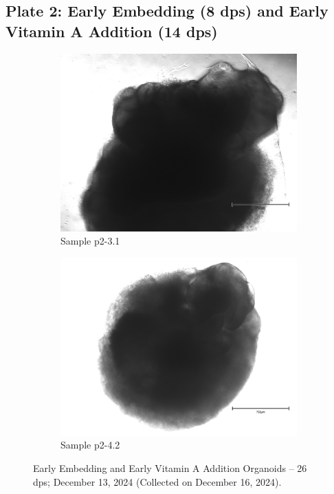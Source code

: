 \documentclass[11pt]{article}
\begin{document}
\subsection{Plate 2: Early Embedding (8 dps) and Early Vitamin A Addition (14 dps)}

\begin{figure}[H]
    \centering
    \begin{subfigure}[b]{0.40\textwidth}
        \centering
        \includegraphics[width=\textwidth]{p2-3.1.jpeg}
        \caption{Sample p2-3.1}
        \label{fig:p2-3.1}
    \end{subfigure}
    \hfill
    \begin{subfigure}[b]{0.40\textwidth}
        \centering
        \includegraphics[width=\textwidth]{p2-4.2.jpeg}
        \caption{Sample p2-4.2}
        \label{fig:p2-4.2}
    \end{subfigure}
    \caption{Early Embedding and Early Vitamin A Addition Organoids -- 26 dps; December 13, 2024 (Collected on December 16, 2024).}
    \label{fig:p2_gallery}
\end{figure}
\end{document}
